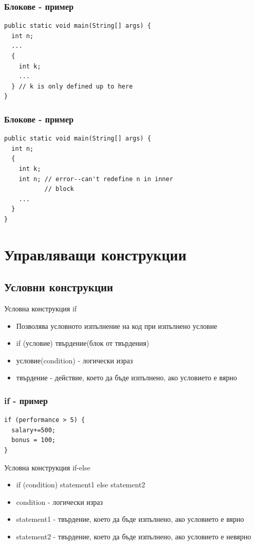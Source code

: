 \documentclass{beamer}
\begin{document}
\begin{frame}[fragile]
  \transdissolve
  \frametitle{Блокове - пример}
\begin{lstlisting}
public static void main(String[] args) {
  int n;
  ...
  {
    int k;
    ... 
  } // k is only defined up to here
}
\end{lstlisting}
\end{frame}

\begin{frame}[fragile]
  \frametitle{Блокове - пример}
  \transdissolve
\begin{lstlisting}
public static void main(String[] args) {
  int n;
  {
    int k;
    int n; // error--can't redefine n in inner
           // block
    ...
  } 
}
\end{lstlisting}
\end{frame}

\section{Управляващи конструкции}
\subsection{Условни конструкции}

\begin{frame}{Условна конструкция if}
  \transdissolve
  \begin{itemize}
  \item Позволява условното изпълнение на код при изпълнено условие \pause
  \item if (условие) твърдение(блок от твърдения) \pause
  \item условие(condition) - логически израз \pause
  \item твърдение - действие, което да бъде
    изпълнено, ако условието е вярно
  \end{itemize}
\end{frame}

\begin{frame}[fragile]
  \frametitle{if - пример}
  \transdissolve
\begin{lstlisting}
if (performance > 5) {
  salary+=500;
  bonus = 100;
}
\end{lstlisting}
\end{frame}

\begin{frame}{Условна конструкция if-else}
  \transdissolve
  \begin{itemize}
  \item if (condition) statement1 else statement2 \pause
  \item condition - логически израз \pause
  \item statement1 - твърдение, което да бъде
      изпълнено, ако условието е вярно \pause
  \item statement2 - твърдение, което да бъде
    изпълнено, ако условието е невярно \pause
  \end{itemize}
\end{frame}
\end{document}
